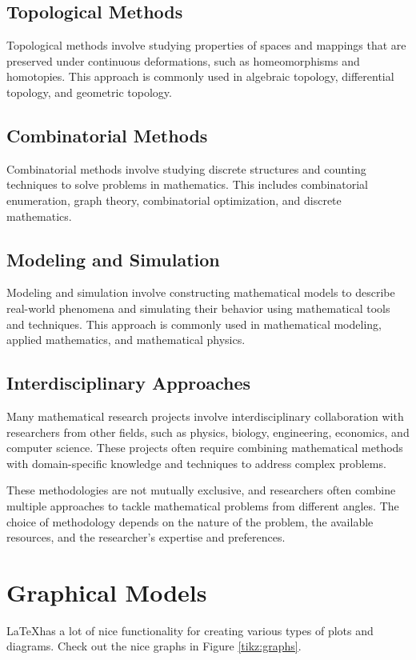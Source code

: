 \subsection{Topological Methods}
Topological methods involve studying properties of spaces and mappings that are preserved under continuous deformations, such as homeomorphisms and homotopies.
This approach is commonly used in algebraic topology, differential topology, and geometric topology.

\subsection{Combinatorial Methods}
Combinatorial methods involve studying discrete structures and counting techniques to solve problems in mathematics.
This includes combinatorial enumeration, graph theory, combinatorial optimization, and discrete mathematics.

\subsection{Modeling and Simulation}
Modeling and simulation involve constructing mathematical models to describe real-world phenomena and simulating their behavior using mathematical tools and techniques.
This approach is commonly used in mathematical modeling, applied mathematics, and mathematical physics.

\subsection{Interdisciplinary Approaches}
Many mathematical research projects involve interdisciplinary collaboration with researchers from other fields, such as physics, biology, engineering, economics, and computer science.
These projects often require combining mathematical methods with domain-specific knowledge and techniques to address complex problems.

These methodologies are not mutually exclusive, and researchers often combine multiple approaches to tackle mathematical problems from different angles. The choice of methodology depends on the nature of the problem, the available resources, and the researcher's expertise and preferences.



\section{Graphical Models}
\LaTeX has a lot of nice functionality for creating various types of
plots and diagrams.
Check out the nice graphs in Figure \ref{tikz:graphs}.

